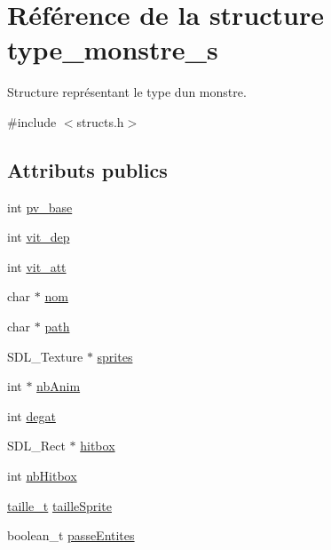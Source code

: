 \hypertarget{structtype__monstre__s}{}\section{Référence de la structure type\+\_\+monstre\+\_\+s}
\label{structtype__monstre__s}


Structure représentant le type d\textquotesingle{}un monstre.  




{\ttfamily \#include $<$structs.\+h$>$}

\subsection*{Attributs publics}
\begin{DoxyCompactItemize}
\item 
int \hyperlink{structtype__monstre__s_a37d1cae3dfb8de6ce15f2601a93cd1cc}{pv\+\_\+base}
\item 
int \hyperlink{structtype__monstre__s_a768470695da3d9377f1e7e97a3c45ed7}{vit\+\_\+dep}
\item 
int \hyperlink{structtype__monstre__s_a5bb66d5b722fc97f901c5eaf7d621fd4}{vit\+\_\+att}
\item 
char $\ast$ \hyperlink{structtype__monstre__s_a18520dadfa451022be8dd63b86a1943c}{nom}
\item 
char $\ast$ \hyperlink{structtype__monstre__s_ad507cb527c078d7a5c565b67d842e968}{path}
\item 
S\+D\+L\+\_\+\+Texture $\ast$ \hyperlink{structtype__monstre__s_ac1a86f0c67aba51892c613210e3de1be}{sprites}
\item 
int $\ast$ \hyperlink{structtype__monstre__s_aecf18b6fa00e710fe27de2d1b738e62c}{nb\+Anim}
\item 
int \hyperlink{structtype__monstre__s_aa3e5568720dc977348e6929f3df5260c}{degat}
\item 
S\+D\+L\+\_\+\+Rect $\ast$ \hyperlink{structtype__monstre__s_aa29ee89bd23e0d9d025e61b831eef91e}{hitbox}
\item 
int \hyperlink{structtype__monstre__s_a5a14ba0498c9fdf7221d788171adafce}{nb\+Hitbox}
\item 
\hyperlink{structtaille__s}{taille\+\_\+t} \hyperlink{structtype__monstre__s_a2b2b4110520736e30d3a4853a9876469}{taille\+Sprite}
\item 
boolean\+\_\+t \hyperlink{structtype__monstre__s_a03f34ddaadae9f002130e70844f142f1}{passe\+Entites}
\item 

\end{DoxyCompactItemize}
